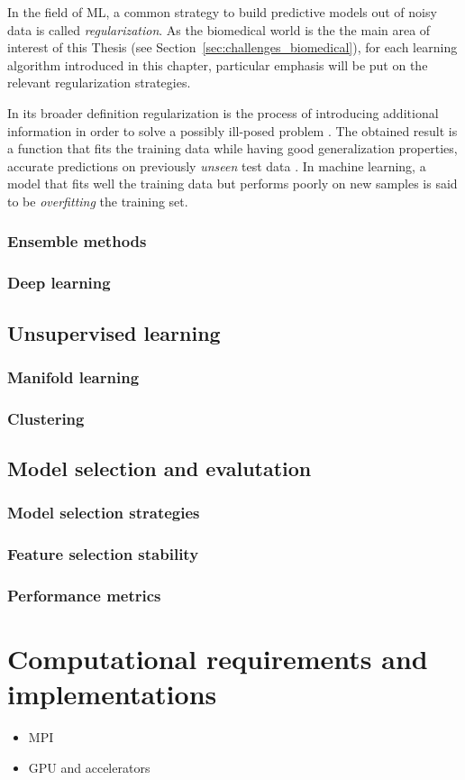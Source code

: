     In the field of ML, a common strategy to build predictive models out of noisy data is called \textit{regularization}. As the biomedical world is the the main area of interest of this Thesis (see Section~\ref{sec:challenges_biomedical}), for each learning algorithm introduced in this chapter, particular emphasis will be put on the relevant regularization strategies.

    In its broader definition regularization is the process of introducing additional information in order to solve a possibly ill-posed problem \cite{tikhonov1963solution, evgeniou2000regularization}. The obtained result is a function that fits the training data while having good generalization properties, \ie accurate predictions on previously  \textit{unseen} test data \cite{hastie2009elements}. In machine learning, a model that fits well the training data but performs poorly on new samples is said to be \textit{overfitting} the training set.
    \subsubsection{Ensemble methods}
    \subsubsection{Deep learning}


  \subsection{Unsupervised learning} \label{subsec:unsupervised_learning}
    \subsubsection{Manifold learning}
    \subsubsection{Clustering}


  \subsection{Model selection and evalutation} \label{subsec:model_selection}
    \subsubsection{Model selection strategies}
    \subsubsection{Feature selection stability}
    \subsubsection{Performance metrics}


\section{Computational requirements and implementations} \label{sec:implementation}
\begin{itemize}
  \item MPI
  \item GPU and accelerators
\end{itemize}
